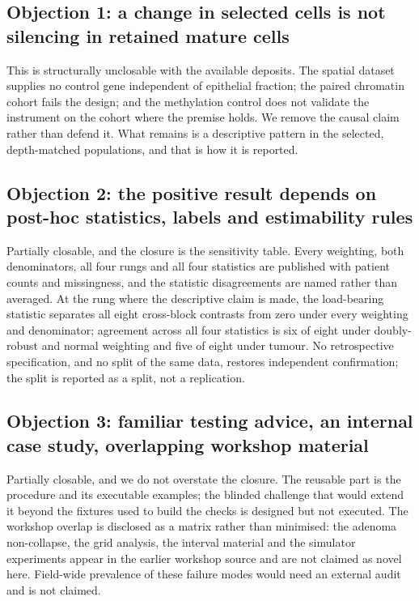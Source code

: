 
\subsection{Objection 1: a change in selected cells is not silencing in
retained mature cells}
This is structurally unclosable with the available deposits. The spatial dataset
supplies no control gene independent of epithelial fraction; the paired chromatin
cohort fails the design; and the methylation control does not validate the
instrument on the cohort where the premise holds. We remove the causal claim
rather than defend it. What remains is a descriptive pattern in the selected,
depth-matched populations, and that is how it is reported.

\subsection{Objection 2: the positive result depends on post-hoc statistics,
labels and estimability rules}
Partially closable, and the closure is the sensitivity table. Every weighting,
both denominators, all four rungs and all four statistics are published with
patient counts and missingness, and the statistic disagreements are named rather
than averaged. At the rung where the descriptive claim is made, the load-bearing
statistic separates all eight cross-block contrasts from zero under every
weighting and denominator; agreement across all four statistics is six of eight
under doubly-robust and normal weighting and five of eight under tumour. No
retrospective specification, and no split of the same data, restores independent
confirmation; the split is reported as a split, not a replication.

\subsection{Objection 3: familiar testing advice, an internal case study,
overlapping workshop material}
Partially closable, and we do not overstate the closure. The reusable part is the
procedure and its executable examples; the blinded challenge that would extend it
beyond the fixtures used to build the checks is designed but not executed. The
workshop overlap is disclosed as a matrix rather than minimised: the adenoma
non-collapse, the grid analysis, the interval material and the simulator
experiments appear in the earlier workshop source and are not claimed as novel
here. Field-wide prevalence of these failure modes would need an external audit
and is not claimed.

